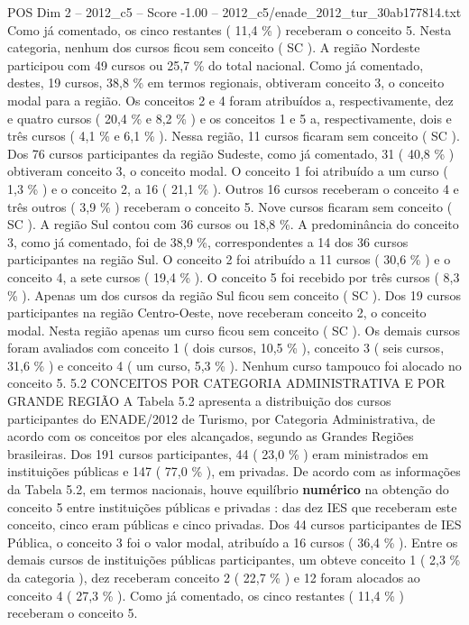 \begin{textsample}{POS Dim 2 – 2012\_c5 – Score -1.00 – 2012\_c5/enade\_2012\_tur\_30ab177814.txt}
Como já comentado, os cinco restantes ( 11,4 \% ) receberam o conceito 5.
Nesta categoria, nenhum dos cursos ficou sem conceito ( SC ).
A região Nordeste participou com 49 cursos ou 25,7 \% do total nacional.
Como já comentado, destes, 19 cursos, 38,8 \% em termos regionais, obtiveram conceito 3, o conceito modal para a região.
Os conceitos 2 e 4 foram atribuídos a, respectivamente, dez e quatro cursos ( 20,4 \% e 8,2 \% ) e os conceitos 1 e 5 a, respectivamente, dois e três cursos ( 4,1 \% e 6,1 \% ).
Nessa região, 11 cursos ficaram sem conceito ( SC ).
Dos 76 cursos participantes da região Sudeste, como já comentado, 31 ( 40,8 \% ) obtiveram conceito 3, o conceito modal.
O conceito 1 foi atribuído a um curso ( 1,3 \% ) e o conceito 2, a 16 ( 21,1 \% ).
Outros 16 cursos receberam o conceito 4 e três outros ( 3,9 \% ) receberam o conceito 5.
Nove cursos ficaram sem conceito ( SC ).
A região Sul contou com 36 cursos ou 18,8 \%.
A predominância do conceito 3, como já comentado, foi de 38,9 \%, correspondentes a 14 dos 36 cursos participantes na região Sul.
O conceito 2 foi atribuído a 11 cursos ( 30,6 \% ) e o conceito 4, a sete cursos ( 19,4 \% ).
O conceito 5 foi recebido por três cursos ( 8,3 \% ).
Apenas um dos cursos da região Sul ficou sem conceito ( SC ).
Dos 19 cursos participantes na região Centro-Oeste, nove receberam conceito 2, o conceito modal.
Nesta região apenas um curso ficou sem conceito ( SC ).
Os demais cursos foram avaliados com conceito 1 ( dois cursos, 10,5 \% ), conceito 3 ( seis cursos, 31,6 \% ) e conceito 4 ( um curso, 5,3 \% ).
Nenhum curso tampouco foi alocado no conceito 5. 5.2 CONCEITOS POR CATEGORIA ADMINISTRATIVA E POR GRANDE REGIÃO A Tabela 5.2 apresenta a distribuição dos cursos participantes do ENADE/2012 de Turismo, por Categoria Administrativa, de acordo com os conceitos por eles alcançados, segundo as Grandes Regiões brasileiras.
Dos 191 cursos participantes, 44 ( 23,0 \% ) eram ministrados em instituições públicas e 147 ( 77,0 \% ), em privadas.
De acordo com as informações da Tabela 5.2, em termos nacionais, houve equilíbrio \textbf{numérico} na obtenção do conceito 5 entre instituições públicas e privadas : das dez IES que receberam este conceito, cinco eram públicas e cinco privadas.
Dos 44 cursos participantes de IES Pública, o conceito 3 foi o valor modal, atribuído a 16 cursos ( 36,4 \% ).
Entre os demais cursos de instituições públicas participantes, um obteve conceito 1 ( 2,3 \% da categoria ), dez receberam conceito 2 ( 22,7 \% ) e 12 foram alocados ao conceito 4 ( 27,3 \% ).
Como já comentado, os cinco restantes ( 11,4 \% ) receberam o conceito 5.

\end{textsample}
